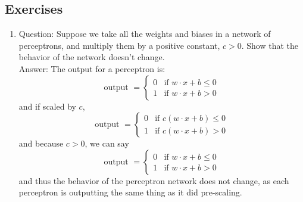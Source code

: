 \documentclass{article}
\begin{document}
	\subsection{Exercises}
		\begin{enumerate}
			\item
				Question: Suppose we take all the weights and biases in a network of perceptrons, and multiply them by a positive constant, $c>0$. Show that the behavior of the network doesn't change. \\
				Answer: The output for a perceptron is:
				\begin{equation*}
					\text{output } = \begin{cases} 0 &\mbox{if } w \cdot x + b \leq 0 \\
								          1 &\mbox{if } w \cdot x + b > 0 \end{cases}
				\end{equation*}
				and if scaled by $c$,
				\begin{equation*}
					\text{output } = \begin{cases} 0 &\mbox{if } c(w \cdot x + b) \leq 0 \\
								          1 &\mbox{if } c(w \cdot x + b) > 0 \end{cases}
				\end{equation*}
				and because $c > 0$, we can say
				\begin{equation*}
					\text{output } = \begin{cases} 0 &\mbox{if } w \cdot x + b \leq 0 \\
								          1 &\mbox{if } w \cdot x + b > 0 \end{cases}
				\end{equation*}
				and thus the behavior of the perceptron network does not change, as each perceptron is outputting the same thing as it did pre-scaling. \\


\end{enumerate}
\end{document}
